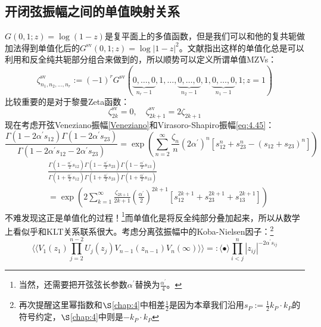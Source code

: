 \subsection{开闭弦振幅之间的单值映射关系}
$G(0,1;z)=\log(1-z)$是复平面上的多值函数，但是我们可以和他的复共轭做加法得到单值化后的$G^{\mathrm{sv}}(0,1;z) = \log|1-z|^2$。文献\cite{BROWN2004527,BROWN_2014,schnetz2013graphical}指出这样的单值化总是可以利用和反全纯共轭部分组合来做到的，所以顺势可以定义所谓单值MZVs：
\begin{equation}
	\zeta^{\mathrm{sv}}_{n_1,n_2,...,n_r}:=(-1)^rG^{\mathrm{sv}}(\underbrace{0,\ldots,0}_{n_r-1},1,\ldots,\underbrace{0,\ldots,0}_{n_2-1},1,\underbrace{0,\ldots,0}_{n_1-1},1;z=1)
\end{equation}
比较重要的是对于黎曼Zeta函数：
\begin{equation}
	\zeta_{2k}^\mathrm{sv}=0,\quad\zeta_{2k+1}^\mathrm{sv}=2\zeta_{2k+1}
\end{equation}
现在考虑开弦Veneziano振幅\ref{Veneziano}和Virasoro-Shapiro振幅\ref{eq:4.45}：
\begin{equation}
	\frac{\Gamma(1-2\alpha^{\prime}s_{12})\Gamma(1-2\alpha^{\prime}s_{23})}{\Gamma(1-2\alpha^{\prime}s_{12}-2\alpha^{\prime}s_{23})}=\exp\left(\sum_{n=2}^{\infty}\frac{\zeta_{n}}{n}(2\alpha^{\prime})^{n}\left[s_{12}^{n}+s_{23}^{n}-(s_{12}+s_{23})^{n}\right]\right)
\end{equation}
\begin{equation}
\begin{aligned}
		&\frac{\Gamma(1-\frac{\alpha^{\prime}}{2}s_{12})\Gamma(1-\frac{\alpha^{\prime}}{2}s_{23})\Gamma(1-\frac{\alpha^{\prime}}{2}s_{13})}{\Gamma(1+\frac{\alpha^{\prime}}{2}s_{12})\Gamma(1+\frac{\alpha^{\prime}}{2}s_{23})\Gamma(1+\frac{\alpha^{\prime}}{2}s_{13})}\\
	&=\exp\left(2\sum_{k=1}^{\infty}\frac{\zeta_{2k+1}}{2k+1}\left(\frac{\alpha^{\prime}}{2}\right)^{2k+1}\left[s_{12}^{2k+1}+s_{23}^{2k+1}+s_{13}^{2k+1}\right]\right)
\end{aligned}
\end{equation}
不难发现这正是单值化的过程！\footnote{当然，还需要把开弦弦长参数$\alpha^\prime$替换为$\frac{\alpha^\prime}{4}$。}而单值化是将反全纯部分叠加起来，所以从数学上看似乎和KLT关系联系很大。考虑分离弦振幅中的Koba-Nielsen因子：\footnote{再次提醒这里幂指数和$\S$\ref{chap:4}中相差$\frac12$是因为本章我们沿用$s_P:=\frac12 k_P\cdot k_P$的符号约定，$\S$\ref{chap:4}中则是$-k_P\cdot k_P$}
\begin{equation}
	\langle\langle V_1(z_1)\prod_{j=2}^{n-2}U_j(z_j)V_{n-1}(z_{n-1})V_n(\infty)\rangle\rangle=:\langle\bullet\rangle\prod_{i<j}^n|z_{ij}|^{-2\alpha^{\prime}s_{ij}}
\end{equation}

